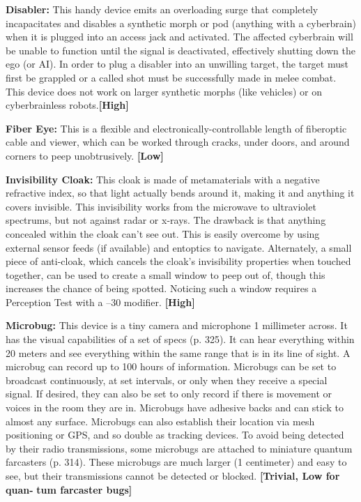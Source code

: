 \textbf{Disabler:} This handy device emits an overloading 
surge that completely incapacitates and disables a 
synthetic morph or pod (anything with a cyberbrain) 
when it is plugged into an access jack and activated. 
The affected cyberbrain will be unable to function until 
the signal is deactivated, effectively shutting down the 
ego (or AI). In order to plug a disabler into an unwilling
target, the target must first be grappled or a called
shot must be successfully made in melee combat. This 
device does not work on larger synthetic morphs (like 
vehicles) or on cyberbrainless robots.\textbf{[High]}

\textbf{Fiber Eye:} This is a flexible and electronically-controllable
length of fiberoptic cable and viewer, which
can be worked through cracks, under doors, and 
around corners to peep unobtrusively. \textbf{[Low]}

\textbf{Invisibility Cloak:} This cloak is made of metamaterials
with a negative refractive index, so that light
actually bends around it, making it and anything it 
covers invisible. This invisibility works from the 
microwave to ultraviolet spectrums, but not against 
radar or x-rays. The drawback is that anything concealed
within the cloak can't see out. This is easily
overcome by using external sensor feeds (if available) 
and entoptics to navigate. Alternately, a small piece of 
anti-cloak, which cancels the cloak's invisibility properties
when touched together, can be used to create a
small window to peep out of, though this increases 
the chance of being spotted. Noticing such a window 
requires a Perception Test with a –30 modifier. \textbf{[High]}

\textbf{Microbug: }This device is a tiny camera and microphone
1 millimeter across. It has the visual capabilities
of a set of specs (p. 325). It can hear everything
within 20 meters and see everything within the same 
range that is in its line of sight. A microbug can record 
up to 100 hours of information. Microbugs can be 
set to broadcast continuously, at set intervals, or only 
when they receive a special signal. If desired, they 
can also be set to only record if there is movement 
or voices in the room they are in. Microbugs have 
adhesive backs and can stick to almost any surface. 
Microbugs can also establish their location via mesh 
positioning or GPS, and so double as tracking devices. 
To avoid being detected by their radio transmissions, 
some microbugs are attached to miniature quantum 
farcasters (p. 314). These microbugs are much larger 
(1 centimeter) and easy to see, but their transmissions 
cannot be detected or blocked. \textbf{[Trivial, Low for quan-}
\textbf{tum farcaster bugs]}

